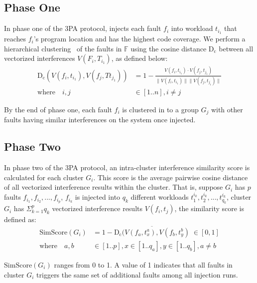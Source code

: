 \subsection{Phase One}

In phase one of the 3PA protocol, \tool injects each fault $f_i$ into workload $t_{i_1}$ that reaches $f_i$'s program location 
and has the highest code coverage. 
We perform a hierarchical clustering~\cite{kaufman2009finding} of the faults in $\mathbb F$ using the cosine distance $\mathrm{D_c}$ between all vectorized interferences $V(F_i, T_{i_1})$, as defined below:
\begin{equation}
\begin{aligned}
\mathrm{D_c}(V(f_i, t_{i_1}), V(f_j, Tt_{j_1})) &= 1 - \frac{V(f_i, t_{i_1}) \cdot V(f_j, t_{j_1})}{\lVert V(f_i, t_{i_1}) \rVert \lVert V(f_j, t_{j_1}) \rVert } \\
\mathrm{where} \quad i, j &\in [1..n], i \neq j
\end{aligned}
\end{equation}

By the end of phase one, each fault $f_i$ is clustered in to a group $G_j$ with other faults having similar interferences on the system once injected.

\subsection{Phase Two}

In phase two of the 3PA protocol, an intra-cluster interference similarity score is calculated for each cluster $G_i$.
This score is the average pairwise cosine distance of all vectorized interference results within the cluster.
That is, suppose $G_i$ has $p$ faults $f_{i_1}, f_{i_2}, ..., f_{i_p}$, $f_{i_k}$ is injected into $q_k$ different workloads $t_1^{i_k}, t_2^{i_k}, ..., t_{q_k}^{i_k}$, cluster $G_i$ has $\Sigma_{k=1}^p q_k$ vectorized interference results $V(f_i, t_j)$, the similarity score is defined as:
\begin{equation}
\begin{aligned}
\mathrm{SimScore}(G_i) &= 1-\overline{\mathrm{D_c}(V(f_a, t_x^a), V(f_b, t_y^b)} \; \in [0,1] \\
\mathrm{where} \quad a, b &\in [1..p], x \in [1..q_a], y \in [1..q_b], a \neq b
\end{aligned}
\end{equation}

$\mathrm{SimScore}(G_i)$ ranges from 0 to 1. A value of 1 indicates that all faults in cluster $G_i$ triggers the same set of additional faults among all injection runs.

